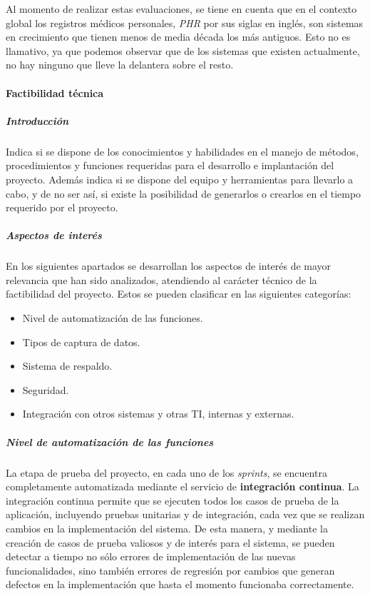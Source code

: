 Al momento de realizar estas evaluaciones, se tiene en cuenta que en el contexto global los registros médicos personales, \textit{PHR} por sus siglas en inglés, son sistemas en crecimiento que tienen menos de media década los más antiguos.
Esto no es llamativo, ya que podemos observar que de los sistemas que existen actualmente, no hay ninguno que lleve la delantera sobre el resto.


\paragraph{Factibilidad técnica}

\subparagraph{Introducción}

Indica si se dispone de los conocimientos y habilidades en el manejo de métodos, procedimientos y funciones requeridas para el desarrollo e implantación del proyecto.
Además indica si se dispone del equipo y herramientas para llevarlo a cabo, y de no ser así, si existe la posibilidad de generarlos o crearlos en el tiempo requerido por el proyecto. %

\subparagraph{Aspectos de interés}

En los siguientes apartados se desarrollan los aspectos de interés de mayor relevancia que han sido analizados, atendiendo al carácter técnico de la factibilidad del proyecto.
Estos se pueden clasificar en las siguientes categorías:

\begin{itemize}
    \item Nivel de automatización de las funciones.
    \item Tipos de captura de datos.
    \item Sistema de respaldo.
    \item Seguridad.
    \item Integración con otros sistemas y otras TI, internas y externas.
\end{itemize}



\subparagraph{Nivel de automatización de las funciones}
    
    La etapa de prueba del proyecto, en cada uno de los \textit{sprints}, se encuentra completamente automatizada mediante el servicio de \textbf{integración continua}.
    La integración continua permite que se ejecuten todos los casos de prueba de la aplicación, incluyendo pruebas unitarias y de integración, cada vez que se realizan cambios en la implementación del sistema.
    De esta manera, y mediante la creación de casos de prueba valiosos y de interés para el sistema, se pueden detectar a tiempo no sólo errores de implementación de las nuevas funcionalidades, sino también errores de regresión por cambios que generan defectos en la implementación que hasta el momento funcionaba correctamente.
    
